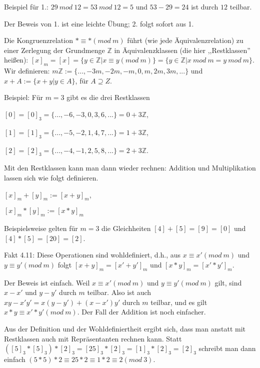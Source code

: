 \documentclass[a4paper]{article}
\begin{document}
\begin{multicols}{3}
    Beispiel für 1.: $29\ mod\ 12 = 53\ mod\ 12 = 5$ und $53-29 = 24$ ist durch $12$ teilbar.

    Der Beweis von 1. ist eine leichte Übung; 2. folgt sofort aus 1.

    Die Kongruenzrelation $* \equiv *(mod\ m)$ führt (wie jede Äquivalenzrelation) zu einer Zerlegung der Grundmenge $\mathbb{Z}$ in Äquivalenzklassen (die hier ,,Restklassen'' heißen): $[x]_m= [x] =\{y\in\mathbb{Z}|x\equiv y(mod\ m)\}=\{y\in\mathbb{Z}|x\ mod\ m=y\ mod\ m\}$. Wir definieren: $m\mathbb{Z}:=\{...,-3m,-2m,-m,0,m,2m,3m,...\}$ und $x+A:=\{x+y|y\in A\}$, für $A\supseteq Z$.

    Beispiel: Für $m=3$ gibt es die drei Restklassen
    \begin{itemize*}
        \item $[0] = [0]_3 =\{...,-6,-3,0,3,6,...\}= 0 + 3\mathbb{Z}$,
        \item $[1] = [1]_3 =\{...,-5,-2,1,4,7,...\}= 1 + 3\mathbb{Z}$,
        \item $[2] = [2]_3 =\{...,-4,-1,2,5,8,...\}= 2 + 3\mathbb{Z}$.
    \end{itemize*}

    Mit den Restklassen kann man dann wieder rechnen: Addition und Multiplikation lassen sich wie folgt definieren.
    \begin{itemize*}
        \item $[x]_m+ [y]_m := [x+y]_m$,
        \item $[x]_m*[y]_m := [x*y]_m$
    \end{itemize*}

    Beispielsweise gelten für $m=3$ die Gleichheiten $[4] + [5] = [9] = [0]$ und $[4]*[5] =[20] = [2]$.

    Fakt 4.11: Diese Operationen sind wohldefiniert, d.h., aus $x\equiv x'(mod\ m)$ und $y\equiv y'(mod\ m)$ folgt $[x+y]_m= [x'+y']_m$ und $[x*y]_m= [x'*y']_m$.

    Der Beweis ist einfach. Weil $x\equiv x' (mod\ m)$ und $y\equiv y' (mod\ m)$ gilt, sind $x-x'$ und $y-y'$ durch $m$ teilbar. Also ist auch $xy-x'y'=x(y-y') + (x-x')y'$ durch $m$ teilbar, und es gilt $x*y\equiv x'*y' (mod\ m)$. Der Fall der Addition ist noch einfacher.

    Aus der Definition und der Wohldefiniertheit ergibt sich, dass man anstatt mit Restklassen auch mit Repräsentanten rechnen kann. Statt $([5]_3 *[5]_3)*[2]_3 = [25]_3 *[2]_3 = [1]_3 *[2]_3 = [2]_3$ schreibt man dann einfach $(5*5)* 2 \equiv 25 * 2 \equiv 1 * 2 \equiv 2 (mod\ 3)$.


\end{multicols}
\end{document}
